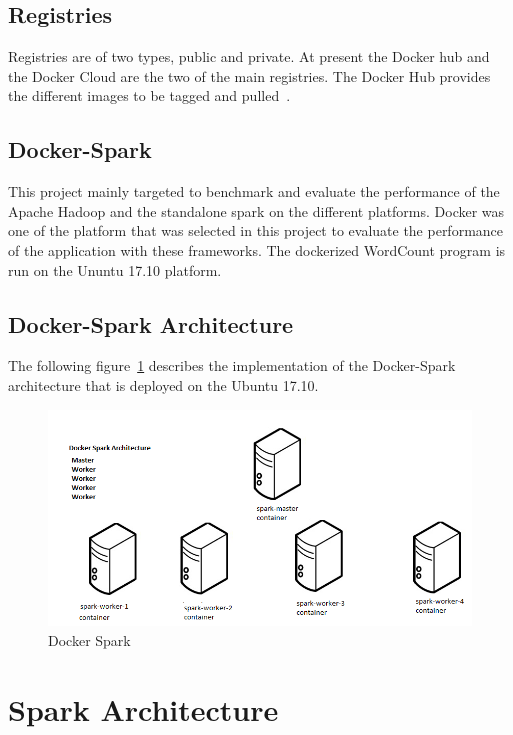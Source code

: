 \subsection{Registries}
Registries are of two types, public and private. 
At present the Docker hub and the Docker Cloud are 
the two of the main registries. The Docker 
Hub provides the different images to be tagged  
and pulled~\cite{hid-sp18-412-docker_wikepedia}.

\subsection{Docker-Spark}
This project mainly targeted to benchmark and evaluate 
the performance of the Apache Hadoop and the standalone 
spark on the different platforms. Docker was one of the 
platform that was selected in this project to 
evaluate the performance of the application with these frameworks.
The dockerized WordCount program is run on the Ununtu 17.10 platform. 

\subsection{Docker-Spark Architecture} 
The following figure~\ref{s:archidocker} describes the implementation of 
the Docker-Spark architecture that is deployed on the Ubuntu 17.10.

\begin{figure}[!ht]
\centering\includegraphics[width=\textwidth]{images/dockerspark.png}
\caption{Docker Spark}\label{sa:archidocker}\label{s:archidocker}
\end{figure}




\section{Spark Architecture}



